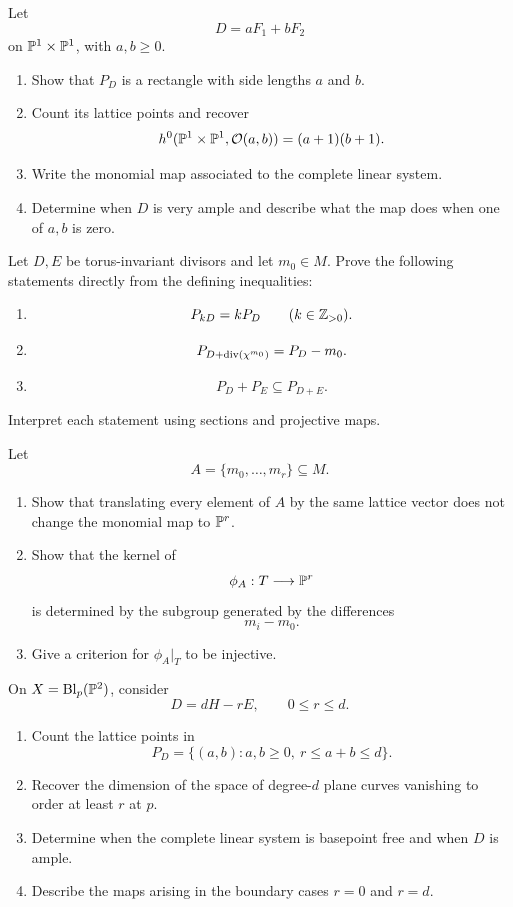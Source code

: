 \begin{exercises}

\item Let
\[
D=aF_1+bF_2
\]
on \(\PP^1\times\PP^1\), with \(a,b\geq0\).
\begin{enumerate}[label=(\alph*),wide=0pt]
\item Show that \(P_D\) is a rectangle with side lengths \(a\) and
\(b\).
\item Count its lattice points and recover
\[
h^0(\PP^1\times\PP^1,\mathcal O(a,b))=(a+1)(b+1).
\]
\item Write the monomial map associated to the complete linear system.
\item Determine when \(D\) is very ample and describe what the map does
when one of \(a,b\) is zero.
\end{enumerate}

\item Let \(D,E\) be torus-invariant divisors and let \(m_0\in M\).
Prove the following statements directly from the defining
inequalities:
\begin{enumerate}[label=(\alph*),wide=0pt]
\item
\[
P_{kD}=kP_D
\qquad(k\in\ZZ_{>0}).
\]
\item
\[
P_{D+\operatorname{div}(\character{m_0})}
=P_D-m_0.
\]
\item
\[
P_D+P_E\subseteq P_{D+E}.
\]
\end{enumerate}
Interpret each statement using sections and projective maps.

\item Let
\[
A=\{m_0,\ldots,m_r\}\subseteq M.
\]
\begin{enumerate}[label=(\alph*),wide=0pt]
\item Show that translating every element of \(A\) by the same lattice
vector does not change the monomial map to \(\PP^r\).
\item Show that the kernel of
\[
\phi_A:T\longrightarrow\PP^r
\]
is determined by the subgroup generated by the differences
\[
m_i-m_0.
\]
\item Give a criterion for \(\phi_A|_T\) to be injective.
\end{enumerate}

\item On \(X=\Blp{\PP^2}{p}\), consider
\[
D=dH-rE,
\qquad
0\leq r\leq d.
\]
\begin{enumerate}[label=(\alph*),wide=0pt]
\item Count the lattice points in
\[
P_D=\{(a,b):a,b\geq0,\ r\leq a+b\leq d\}.
\]
\item Recover the dimension of the space of degree-\(d\) plane curves
vanishing to order at least \(r\) at \(p\).
\item Determine when the complete linear system is basepoint free and
when \(D\) is ample.
\item Describe the maps arising in the boundary cases \(r=0\) and
\(r=d\).
\end{enumerate}


\end{exercises}
